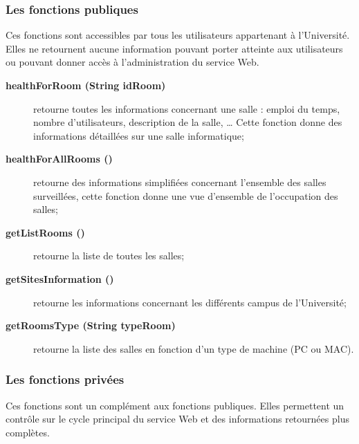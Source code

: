 \subsubsection{Les fonctions publiques}
\label{section:fonctionsPubliques}

Ces fonctions sont accessibles par tous les utilisateurs appartenant \`a l'Universit\'e.
Elles ne retournent aucune information pouvant porter atteinte aux utilisateurs ou pouvant donner acc\`es \`a l'administration du service Web.

\begin{description}
	\item[\textbf{healthForRoom (String idRoom)}] retourne toutes les informations concernant une salle : emploi du temps, nombre d'utilisateurs, description de la salle, {\ldots} Cette fonction donne des informations d\'etaill\'ees sur une salle informatique;
	\item[\textbf{healthForAllRooms ()}] retourne des informations simplifi\'ees concernant l'ensemble des salles surveill\'ees, cette fonction donne une vue d'ensemble de l'occupation des salles;
	\item[\textbf{getListRooms ()}] retourne la liste de toutes les salles;
	\item[\textbf{getSitesInformation ()}] retourne les informations concernant les diff\'erents campus de l'Universit\'e;
	\item[\textbf{getRoomsType (String typeRoom)}] retourne la liste des salles en fonction d'un type de machine (PC ou MAC).

\end{description}

\subsubsection{Les fonctions priv\'ees}

Ces fonctions sont un compl\'ement aux fonctions publiques.
Elles permettent un contr\^ole sur le cycle principal du service Web et des informations retourn\'ees plus compl\`etes.

